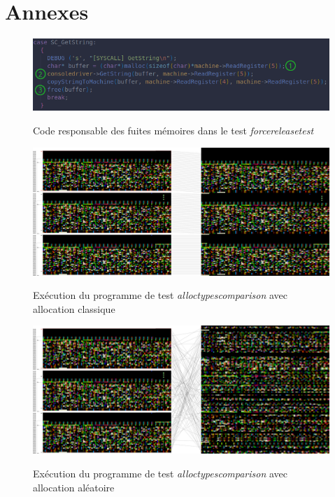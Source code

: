 \documentclass{article}
\begin{document}
\section{Annexes}
\begin{figure}[h]
    \caption{Code responsable des fuites mémoires dans le test \textit{forcereleasetest}}
    \centering
    \includegraphics[width=\textwidth,height=\textheight,keepaspectratio]{Leak}
    \label{fig:fuites}
\end{figure}

\begin{figure}[h]
    \caption{Exécution du programme de test \textit{alloctypescomparison} avec allocation classique}
    \centering
    \includegraphics[width=\textwidth,height=\textheight,keepaspectratio]{memory_classic}
    \label{fig:alloc_classic}
\end{figure}

\begin{figure}[h]
    \caption{Exécution du programme de test \textit{alloctypescomparison} avec allocation aléatoire}
    \centering
    \includegraphics[width=\textwidth,height=\textheight,keepaspectratio]{memory_random}
    \label{fig:alloc_random}
\end{figure}
\end{document}
